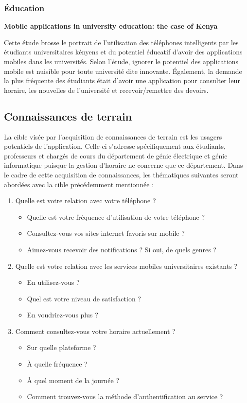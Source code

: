 		\subsubsection{Éducation}
		{\bfseries \cite{kenya} Mobile applications in university education: the case of Kenya}
		
		Cette étude brosse le portrait de l'utilisation des téléphones intelligents par les étudiants universitaires kényens et du potentiel éducatif d'avoir des applications mobiles dans les universités. Selon l'étude, ignorer le potentiel des applications mobile est nuisible pour toute université dite innovante. Également, la demande la plus fréquente des étudiants était d'avoir une application pour consulter leur horaire, les nouvelles de l'université et recevoir/remettre des devoirs.
	
	\subsection{Connaissances de terrain}
	La cible visée par l'acquisition de connaissances de terrain est les usagers potentiels de l'application. Celle-ci s'adresse spécifiquement aux étudiants, professeurs et chargés de cours du département de génie électrique et génie informatique puisque la gestion d'horaire ne concerne que ce département. Dans le cadre de cette acquisition de connaissances, les thématiques suivantes seront abordées avec la cible précédemment mentionnée :

	\begin{enumerate}
		\item Quelle est votre relation avec votre téléphone ?
		\begin{itemize}
			\item Quelle est votre fréquence d'utilisation de votre téléphone ?
			\item Consultez-vous vos sites internet favoris sur mobile ?
			\item Aimez-vous recevoir des notifications ? Si oui, de quels genres ?
		\end{itemize}
		\item Quelle est votre relation avec les services mobiles universitaires existants ?
		\begin{itemize}
			\item En utilisez-vous ?
			\item Quel est votre niveau de satisfaction ?
			\item En voudriez-vous plus ?
		\end{itemize}
		\item Comment consultez-vous votre horaire actuellement ?
		\begin{itemize}
			\item Sur quelle plateforme ?
			\item À quelle fréquence ?
			\item À quel moment de la journée ?
			\item Comment trouvez-vous la méthode d'authentification au service ?
		\end{itemize}
	\end{enumerate}
	
